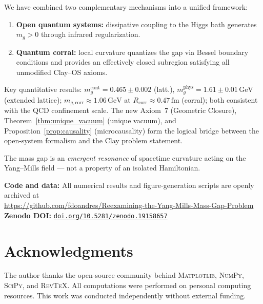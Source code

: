\documentclass[12pt,a4paper]{article}
\theoremstyle{definition}
\newcommand{\GeV}{\,\mathrm{GeV}}
\newcommand{\fm}{\,\mathrm{fm}}
\newcommand{\mgcorr}{m_{g,\mathrm{corr}}}
\newcommand{\Rcorr}{R_{\mathrm{corr}}}
\newcommand{\mgcont}{m_{g}^{\mathrm{cont}}}
\newcommand{\zenodoDOI}{10.5281/zenodo.19158657}
\newcommand{\githubURL}{https://github.com/fdoandres/Reexamining-the-Yang-Mills-Mass-Gap-Problem}
\begin{document}
We have combined two complementary mechanisms into a unified framework:
\begin{enumerate}
  \item \textbf{Open quantum systems:} dissipative coupling to the Higgs
        bath generates $m_{g} > 0$ through infrared regularization.
  \item \textbf{Quantum corral:} local curvature quantizes the gap via
        Bessel boundary conditions and provides an effectively closed
        subregion satisfying all unmodified Clay--OS axioms.
\end{enumerate}

Key quantitative results: $\mgcont = 0.465 \pm 0.002$ (latt.),
$m_{g}^{\mathrm{phys}} = 1.61 \pm 0.01\GeV$ (extended lattice);
$\mgcorr \approx 1.06\GeV$ at $\Rcorr \approx 0.47\fm$ (corral);
both consistent with the QCD confinement scale. The new Axiom~7
(Geometric Closure), Theorem~\ref{thm:unique_vacuum} (unique vacuum),
and Proposition~\ref{prop:causality} (microcausality) form the logical
bridge between the open-system formalism and the Clay problem statement.

The mass gap is an \emph{emergent resonance} of spacetime curvature acting
on the Yang--Mills field — not a property of an isolated Hamiltonian.

\medskip
\noindent\textbf{Code and data:}
All numerical results and figure-generation scripts are openly archived at\\
\url{\githubURL}\\[2pt]
\noindent\textbf{Zenodo DOI:}
\href{https://doi.org/\zenodoDOI}{\texttt{doi.org/\zenodoDOI}}

\section*{Acknowledgments}
The author thanks the open-source community behind \textsc{Matplotlib},
\textsc{NumPy}, \textsc{SciPy}, and \textsc{RevTeX}. All computations
were performed on personal computing resources. This work was conducted
independently without external funding.
\end{document}
